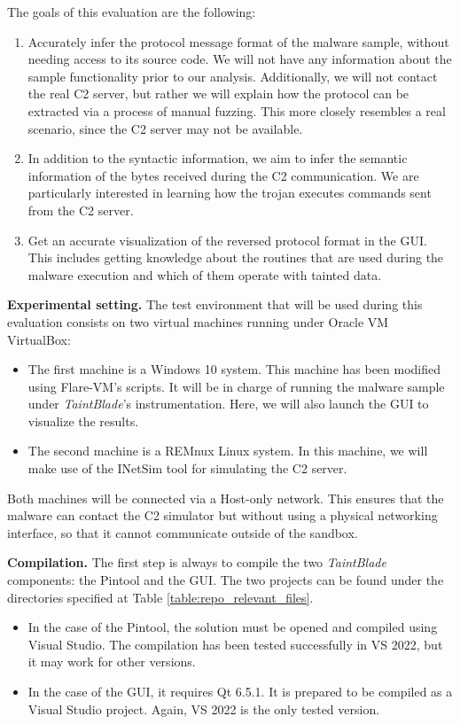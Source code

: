\documentclass[conference]{IEEEtran}
\begin{document}
The goals of this evaluation are the following:
\begin{enumerate}
    \item Accurately infer the protocol message format of the malware sample, without
          needing access to its source code. We will not have any information about the
          sample functionality prior to our analysis. Additionally, we will not contact
          the real C2 server, but rather we will explain how the protocol can be
          extracted via a process of manual fuzzing. This more closely resembles a real
          scenario, since the C2 server may not be available.
    \item In addition to the syntactic information, we aim to infer the semantic
          information of the bytes received during the C2 communication. We are
          particularly interested in learning how the trojan executes commands sent from
          the C2 server.
    \item Get an accurate visualization of the reversed protocol format in the GUI. This
          includes getting knowledge about the routines that are used during the malware
          execution and which of them operate with tainted data.
\end{enumerate}

\textbf{Experimental setting.}
The test environment that will be used during this evaluation consists on two virtual machines
running under Oracle VM VirtualBox\cite{virtualbox_page}:
\begin{itemize}
    \item The first machine is a Windows 10 system. This machine has been modified using
          Flare-VM's scripts\cite{flarevm}. It will be in charge of running the malware
          sample under \textit{TaintBlade}'s instrumentation. Here, we will also launch
          the GUI to visualize the results.
    \item The second machine is a REMnux Linux system\cite{remnux}. In this machine, we
          will make use of the INetSim tool for simulating the C2 server.
\end{itemize}
Both machines will be connected via a Host-only network. This ensures that the malware can contact the C2 simulator
but without using a physical networking interface, so that it cannot communicate outside of the sandbox.

\textbf{Compilation.}
The first step is always to compile the two \textit{TaintBlade} components: the Pintool and the GUI.
The two projects can be found under the directories specified at Table \ref{table:repo_relevant_files}.
\begin{itemize}
    \item In the case of the Pintool, the solution must be opened and compiled using
          Visual Studio. The compilation has been tested successfully in VS 2022, but it
          may work for other versions.
    \item In the case of the GUI, it requires Qt 6.5.1. It is prepared to be compiled as
          a Visual Studio project. Again, VS 2022 is the only tested version.
\end{itemize}
\end{document}
